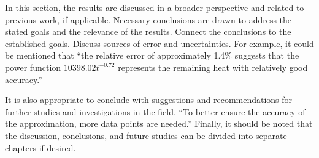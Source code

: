 \documentclass[a4paper]{article}
\begin{document}
In this section, the results are discussed in a broader perspective and related to previous work, if applicable. Necessary conclusions are drawn to address the stated goals and the relevance of the results. Connect the conclusions to the established goals. Discuss sources of error and uncertainties. For example, it could be mentioned that ``the relative error of approximately 1.4\% suggests that the power function $10398.02t^{-0.72}$ represents the remaining heat with relatively good accuracy.''

It is also appropriate to conclude with suggestions and recommendations for further studies and investigations in the field. ``To better ensure the accuracy of the approximation, more data points are needed.'' Finally, it should be noted that the discussion, conclusions, and future studies can be divided into separate chapters if desired.

\newpage



%
%
\end{document}
